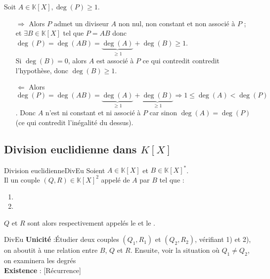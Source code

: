 \documentclass[12pt,a4paper]{report}
\begin{document}
        \begin{demo}
        Soit $A \in \mathbb{K}[X], \deg(P) \geqslant 1$.
        \begin{itemize}
            \item[$\Rightarrow$] Alors $P$ admet un diviseur $A$ non nul, non constant et non associé à $P$ ; et $\exists B \in \mathbb{K}[X]$ tel que $P = AB$ donc $\deg(P) = \deg(AB) = \underbrace{\deg(A)}_{\geqslant 1} + \deg(B) \geqslant 1$.\\
            Si $\deg(B) = 0$, alors $A$ est associé à $P$ ce qui contredit contredit l'hypothèse, donc $\deg(B) \geqslant 1$.
            \item[$\Leftarrow$] Alors $\deg(P) = \deg(AB) = \underbrace{\deg(A)}_{\geqslant 1} + \underbrace{\deg(B)}_{\geqslant 1} \Rightarrow 1 \leqslant \deg(A) < \deg(P)$. Donc $A$ n'est ni constant et ni associé à $P$ car sinon $\deg(A) = \deg(P)$ (ce qui contredit l'inégalité du dessus).
        \end{itemize}
        \end{demo}
   

    \subsection{Division euclidienne dans $K[X]$}
        \begin{theoreme}{Division euclidienne}{DivEu}
        Soient $A \in \mathbb{K}[X]$ et $B \in \mathbb{K}[X]^*$.\\
        Il  un  couple $(Q, R) \in \mathbb{K}[X]^2$ appelé  de $A$ par $B$ tel que :
        \begin{enumerate}
            \item {} 
            \item {}
        \end{enumerate}
        
        $Q$ et $R$ sont alors respectivement appelés le  et le .
        \end{theoreme}
    
        \begin{principedemo}{DivEu}
        \textbf{Unicité} :Étudier deux couples $(Q_{1}, R_{1})$ et $(Q_{2}, R_{2})$, vérifiant 1) et 2), on aboutit à une relation entre $B$, $Q$ et $R$. Ensuite, voir la situation où $Q_{1} \neq Q_{2}$, on examinera les degrés\\
        \textbf{Existence} : [Récurrence]
        \end{principedemo}
\end{document}
